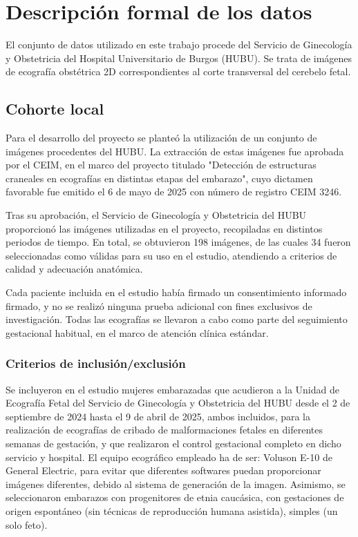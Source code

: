 
\section{Descripción formal de los datos}
El conjunto de datos utilizado en este trabajo procede del Servicio de Ginecología y Obstetricia del Hospital Universitario de Burgos (HUBU). Se trata de imágenes de ecografía obstétrica 2D correspondientes al corte transversal del cerebelo fetal.

\subsection{Cohorte local}
Para el desarrollo del proyecto se planteó la utilización de un conjunto de imágenes procedentes del HUBU. La extracción de estas imágenes fue aprobada por el CEIM, en el marco del proyecto titulado "Detección de estructuras craneales en ecografías en distintas etapas del embarazo", cuyo dictamen favorable fue emitido el 6 de mayo de 2025 con número de registro CEIM 3246.

Tras su aprobación, el Servicio de Ginecología y Obstetricia del HUBU proporcionó las imágenes utilizadas en el proyecto, recopiladas en distintos periodos de tiempo. En total, se obtuvieron 198 imágenes, de las cuales 34 fueron seleccionadas como válidas para su uso en el estudio, atendiendo a criterios de calidad y adecuación anatómica.


Cada paciente incluida en el estudio había firmado un consentimiento informado firmado, y no se realizó ninguna prueba adicional con fines exclusivos de investigación. Todas las ecografías se llevaron a cabo como parte del seguimiento gestacional habitual, en el marco de atención clínica estándar.


\subsubsection{Criterios de inclusión/exclusión}
Se incluyeron en el estudio mujeres embarazadas que acudieron a la Unidad de Ecografía Fetal del Servicio de Ginecología y Obstetricia del HUBU desde el 2 de septiembre de 2024 hasta el 9 de abril de 2025, ambos incluidos, para la realización de ecografías de cribado de malformaciones fetales en diferentes semanas de gestación, y que realizaron el control gestacional completo en dicho servicio y hospital. El equipo ecográfico empleado ha de ser: Voluson E-10 de General Electric, para evitar que diferentes softwares puedan proporcionar imágenes diferentes, debido al sistema de generación de la imagen. Asimismo, se seleccionaron embarazos con progenitores de etnia caucásica, con gestaciones de origen espontáneo (sin técnicas de reproducción humana asistida), simples (un solo feto).

